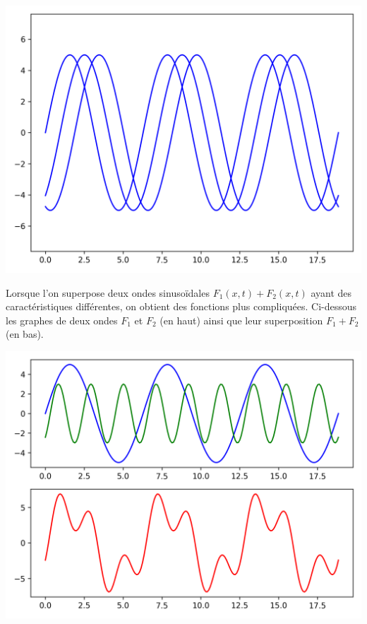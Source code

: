 \documentclass[11pt,class=report,crop=false]{standalone}
\begin{document}
\begin{center}
	\includegraphics[scale=\myscale,scale=0.5]{figures/ondes1D-2}
\end{center}


Lorsque l'on superpose deux ondes sinusoïdales $F_1(x,t) + F_2(x,t)$ ayant des caractéristiques différentes, on obtient des fonctions plus compliquées. Ci-dessous les graphes de deux ondes $F_1$ et $F_2$ (en haut) ainsi que leur superposition $F_1+F_2$ (en bas).

\begin{center}
	\includegraphics[scale=\myscale,scale=0.5]{figures/ondes_superposition}
\end{center}
\end{document}
